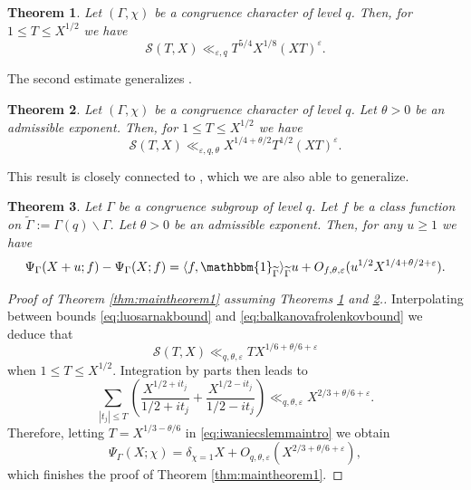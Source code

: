 \documentclass{article}
\newtheorem{thm}{Theorem}[section]
\theoremstyle{named}
\renewcommand{\S}{\mathcal{S}}
\begin{document}
\begin{thm}\label{thm:luosarnakbound}
Let $(\Gamma, \chi)$ be a congruence character of level $q$. Then, for $1 \leq T \leq X^{1/2}$ we have 
\begin{equation}\label{eq:luosarnakbound}
   \S(T, X) \ll_{\varepsilon, q} T^{5/4}X^{1/8} (XT)^\varepsilon.
\end{equation}
\end{thm}

The second estimate generalizes \cite[Theorem 1.2]{balkanova_frolenkov}. 

\begin{thm}\label{thm:balkanovafrolenkovbound}
Let $(\Gamma, \chi)$ be a congruence character of level $q$. Let $\theta > 0$ be an admissible exponent. Then, for $1 \leq T \leq X^{1/2}$ we have 
\begin{equation}\label{eq:balkanovafrolenkovbound}
\S(T, X) \ll_{\varepsilon, q,\theta} X^{1/4 + \theta/2}T^{1/2} (XT)^\varepsilon.
\end{equation}
\end{thm}

This result is closely connected to \cite[Theorem 3.2]{Soundararajan_2013}, which we are also able to generalize.
\begin{thm}\label{thm:soundyoungshortintervals}
Let $\Gamma$ be a congruence subgroup of level $q$. Let $f$ be a class function on $\widetilde{\Gamma}:= \Gamma(q)\backslash \Gamma$. Let $\theta > 0$ be an admissible exponent. Then, for any $u \geq 1$ we have
\begin{equation*}
    \Psi_\Gamma(X + u; f) - \Psi_\Gamma(X; f) = \langle f, \mathbbm{1}_{\widetilde{\Gamma}}\rangle_{\widetilde{\Gamma}} u + O_{f, \theta, \varepsilon}(u^{1/2} X^{1/4 + \theta/2 + \varepsilon}).
\end{equation*}
\end{thm}
\begin{proof}[Proof of Theorem \ref{thm:maintheorem1} assuming Theorems \ref{thm:luosarnakbound} and \ref{thm:balkanovafrolenkovbound}.]

Interpolating between bounds \eqref{eq:luosarnakbound} and \eqref{eq:balkanovafrolenkovbound} we deduce that 
\begin{equation*}
    \S(T, X) \ll_{q, \theta, \varepsilon} T X^{1/6 + \theta/6 + \varepsilon}
\end{equation*}
when $1 \leq T \leq X^{1/2}$. Integration by parts then leads to 
\begin{equation*}
    \sum_{|t_j|\leq T}\left(\frac{X^{1/2 + it_j}}{1/2 + it_j} + \frac{X^{1/2 -it_j}}{1/2 - it_j}\right) \ll_{q, \theta, \varepsilon} X^{2/3 + \theta/6 + \varepsilon}.
\end{equation*}
Therefore, letting $T = X^{1/3 - \theta/6}$ in \eqref{eq:iwaniecslemmaintro} we obtain  
\begin{equation*}
    \Psi_\Gamma(X; \chi) = \delta_{\chi = 1}X + O_{q, \theta, \varepsilon}(X^{2/3 + \theta/6 + \varepsilon}),
\end{equation*}   
which finishes the proof of Theorem \ref{thm:maintheorem1}. 

\end{proof}
\end{document}

